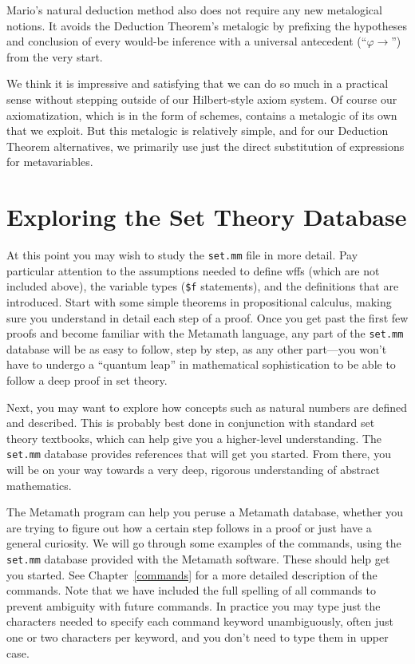 Mario's natural deduction
method also does not require any new metalogical
notions. It avoids the Deduction Theorem's metalogic by prefixing the
hypotheses and conclusion of every would-be inference with a universal
antecedent (``$\varphi \rightarrow$'') from the very start.

We think it is impressive and satisfying that we can do so much in a
practical sense without stepping outside of our Hilbert-style axiom system.
Of course our axiomatization, which is in the form of schemes,
contains a metalogic of its own that we exploit. But this metalogic
is relatively simple, and for our Deduction Theorem alternatives,
we primarily use just the direct substitution of expressions for
metavariables.

\section{Exploring the Set Theory Database}\label{exploring}

At this point you may wish to study the \texttt{set.mm} file in more detail.  Pay particular
attention to the assumptions needed to define wffs (which are not included above), the variable types
(\texttt{\$f} statements), and the
definitions that are introduced.  Start with some simple theorems in
propositional calculus, making sure you understand in detail each step
of a proof.  Once you get past the first few proofs and become familiar
with the Metamath language, any part of the \texttt{set.mm} database
will be as easy to follow, step by step, as any other part---you won't
have to undergo a ``quantum leap'' in mathematical sophistication to be
able to follow a deep proof in set theory.

Next, you may want to explore how concepts such as natural numbers are
defined and described.  This is probably best done in conjunction with
standard set theory textbooks, which can help give you a higher-level
understanding.  The \texttt{set.mm} database provides references that will get
you started.  From there, you will be on your way towards a very deep,
rigorous understanding of abstract mathematics.

The Metamath program can help you peruse a Metamath data\-base,
wheth\-er you are trying to figure out how a certain step follows in a proof or
just have a general curiosity.  We will go through some examples of the
commands, using the \texttt{set.mm}
database provided with the Metamath software.  These should help get you
started.  See Chapter~\ref{commands} for a more detailed description of
the commands.  Note that we have included the full spelling of all commands to
prevent ambiguity with future commands.  In practice you may type just the
characters needed to specify each command keyword
unambiguously, often just one or two characters per keyword, and you don't
need to type them in upper
case.

